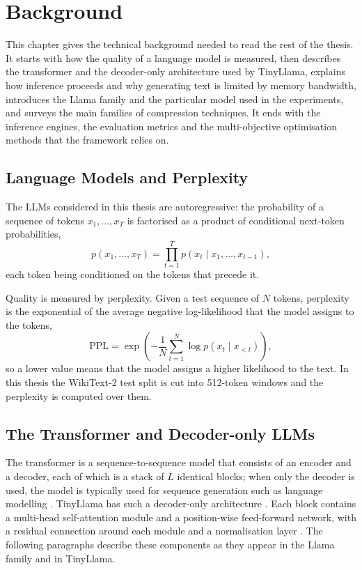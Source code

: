 \chapter{Background}
\label{Chapter2}

This chapter gives the technical background needed to read the rest of the thesis. It starts with how the quality of a language model is measured, then describes the transformer and the decoder-only architecture used by TinyLlama, explains how inference proceeds and why generating text is limited by memory bandwidth, introduces the Llama family and the particular model used in the experiments, and surveys the main families of compression techniques. It ends with the inference engines, the evaluation metrics and the multi-objective optimisation methods that the framework relies on.

\section{Language Models and Perplexity}
\label{sec:ch2-lm}

The LLMs considered in this thesis are autoregressive: the probability of a sequence of tokens $x_1, \dots, x_T$ is factorised as a product of conditional next-token probabilities,
\begin{equation}
  p(x_1, \dots, x_T) = \prod_{t=1}^{T} p(x_t \mid x_1, \dots, x_{t-1}),
  \label{eq:ch2-ar}
\end{equation}
each token being conditioned on the tokens that precede it.

Quality is measured by perplexity. Given a test sequence of $N$ tokens, perplexity is the exponential of the average negative log-likelihood that the model assigns to the tokens,
\begin{equation}
  \mathrm{PPL} = \exp\left( -\frac{1}{N} \sum_{t=1}^{N} \log p(x_t \mid x_{<t}) \right),
  \label{eq:ch2-ppl}
\end{equation}
so a lower value means that the model assigns a higher likelihood to the text. In this thesis the WikiText-2 test split is cut into 512-token windows and the perplexity is computed over them.

\section{The Transformer and Decoder-only LLMs}
\label{sec:ch2-transformer}

The transformer is a sequence-to-sequence model that consists of an encoder and a decoder, each of which is a stack of $L$ identical blocks; when only the decoder is used, the model is typically used for sequence generation such as language modelling \cite{lin2021survey}. TinyLlama has such a decoder-only architecture \cite{zhang2024tinyllama}. Each block contains a multi-head self-attention module and a position-wise feed-forward network, with a residual connection around each module and a normalisation layer \cite{lin2021survey}. The following paragraphs describe these components as they appear in the Llama family and in TinyLlama.

